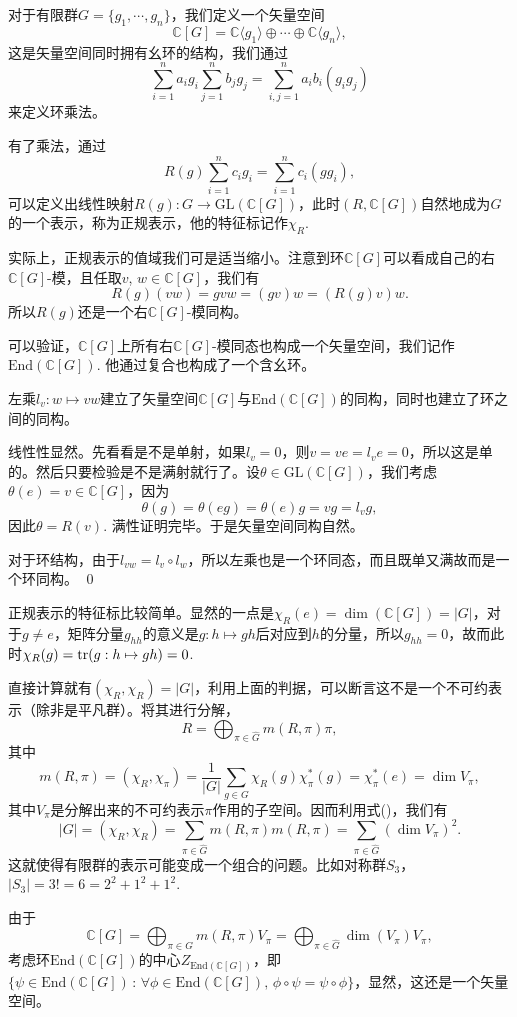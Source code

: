 \documentclass[9pt]{extarticle}
\newcommand{\cc}{\mathbb{C}}
\begin{document}
\para 对于有限群$G=\{g_1,\cdots,g_n\}$，我们定义一个矢量空间
\[
	\cc [G]=\cc\langle g_1\rangle \oplus \cdots \oplus \cc\langle g_n\rangle,
\]
这是矢量空间同时拥有幺环的结构，我们通过
\[
\sum_{i=1}^n a_i g_i\sum_{j=1}^n b_j g_j=\sum_{i,j=1}^n a_ib_i(g_ig_j)
\]
来定义环乘法。

有了乘法，通过
\[
	R(g)\sum_{i=1}^n c_i g_i=\sum_{i=1}^n c_i(gg_i),
\]
可以定义出线性映射$R(g):G\to \mathrm{GL}(\cc [G])$，此时$(R,\cc [G])$自然地成为$G$的一个表示，称为正规表示，他的特征标记作$\chi_R$. 

实际上，正规表示的值域我们可是适当缩小。注意到环$\cc [G]$可以看成自己的右$\cc [G]$-模，且任取$v$, $w\in \cc [G]$，我们有
\[
	R(g)(vw)=gvw=(gv)w=(R(g)v)w.
\]
所以$R(g)$还是一个右$\cc [G]$-模同构。

可以验证，$\cc [G]$上所有右$\cc [G]$-模同态也构成一个矢量空间，我们记作$\mathrm{End}(\cc [G])$. 他通过复合也构成了一个含幺环。

\pro 左乘$l_v:w\mapsto vw$建立了矢量空间$\cc [G]$与$\mathrm{End}(\cc [G])$的同构，同时也建立了环之间的同构。

\proof
	线性性显然。先看看是不是单射，如果$l_v=0$，则$v=ve=l_ve=0$，所以这是单的。然后只要检验是不是满射就行了。设$\theta\in \mathrm{GL}(\cc [G])$，我们考虑$\theta(e)=v\in \cc [G]$，因为
	\[
		\theta(g)=\theta(eg)=\theta(e)g=vg=l_vg,
	\]
	因此$\theta=R(v)$. 满性证明完毕。于是矢量空间同构自然。

	对于环结构，由于$l_{vw}=l_v\circ l_w$，所以左乘也是一个环同态，而且既单又满故而是一个环同构。
\qed

\para 正规表示的特征标比较简单。显然的一点是$\chi_R(e)=\dim (\cc [G])=|G|$，对于$g\neq e$，矩阵分量$g_{hh}$的意义是$g:h\mapsto gh$后对应到$h$的分量，所以$g_{hh}=0$，故而此时$\chi_R(g)=\operatorname{tr}(g:h\mapsto gh)=0$.

直接计算就有$(\chi_{R},\chi_{R})=|G|$，利用上面的判据，可以断言这不是一个不可约表示（除非是平凡群）。将其进行分解，
\[
	R=\bigoplus_{\pi\in\hat{G}}m(R,\pi)\pi,
\]
其中
\[
	m(R,\pi)=(\chi_R,\chi_\pi)=\frac{1}{|G|}\sum_{g\in G}\chi_R(g)\chi_{\pi}^*(g)=\chi_{\pi}^*(e)=\dim V_{\pi},
\]
其中$V_\pi$是分解出来的不可约表示$\pi$作用的子空间。因而利用式(\theequation)，我们有
\[
	|G|=(\chi_{R},\chi_{R})=\sum_{\pi\in\hat{G}}m(R,\pi)m(R,\pi)=\sum_{\pi\in\hat{G}}(\dim V_{\pi})^2.
\]
这就使得有限群的表示可能变成一个组合的问题。比如对称群$S_3$，$|S_3|=3!=6=2^2+1^2+1^2$.

\para 由于
\[
	\cc [G]=\bigoplus_{\pi\in\hat{G}}m(R,\pi)V_\pi=\bigoplus_{\pi\in\hat{G}}\dim(V_\pi)V_\pi,
\]
考虑环$\mathrm{End}(\cc [G])$的中心$Z_{\mathrm{End}(\cc [G])}$，即$\{\psi\in \mathrm{End}(\cc [G])\,:\, \forall \phi\in \mathrm{End}(\cc [G]),\, \phi\circ\psi=\psi\circ\phi\}$，显然，这还是一个矢量空间。
\end{document}
